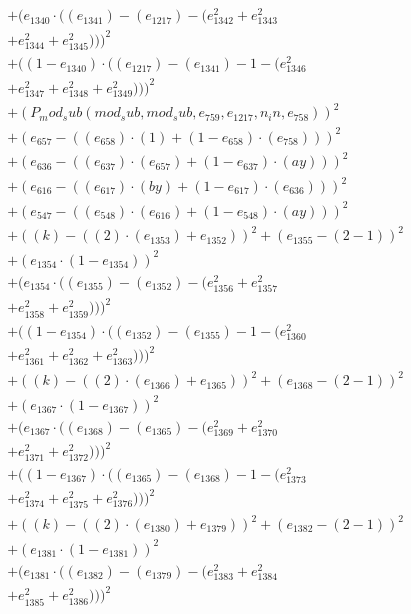 \documentclass[10pt, a4paper]{article}
\begin{document}
\begin{small}
\begin{align*}
& + (e_{1340}  \cdot  ((e_{1341}) - (e_{1217}) - (e_{1342}^{2} + e_{1343}^{2} \\
& + e_{1344}^{2} + e_{1345}^{2})))^{2} \\
& + ((1 - e_{1340})  \cdot  ((e_{1217}) - (e_{1341}) - 1 - (e_{1346}^{2} \\
& + e_{1347}^{2} + e_{1348}^{2} + e_{1349}^{2})))^{2} \\
& + (P_mod_sub(mod_sub, mod_sub, e_{759}, e_{1217}, n_in, e_{758}))^{2} \\
& + (e_{657} - ((e_{658})  \cdot  (1) + (1 - e_{658})  \cdot  (e_{758})))^{2} \\
& + (e_{636} - ((e_{637})  \cdot  (e_{657}) + (1 - e_{637})  \cdot  (ay)))^{2} \\
& + (e_{616} - ((e_{617})  \cdot  (by) + (1 - e_{617})  \cdot  (e_{636})))^{2} \\
& + (e_{547} - ((e_{548})  \cdot  (e_{616}) + (1 - e_{548})  \cdot  (ay)))^{2} \\
& + ((k) - ((2)  \cdot  (e_{1353}) + e_{1352}))^{2} + (e_{1355} - (2 - 1))^{2} \\
& + (e_{1354}  \cdot  (1 - e_{1354}))^{2} \\
& + (e_{1354}  \cdot  ((e_{1355}) - (e_{1352}) - (e_{1356}^{2} + e_{1357}^{2} \\
& + e_{1358}^{2} + e_{1359}^{2})))^{2} \\
& + ((1 - e_{1354})  \cdot  ((e_{1352}) - (e_{1355}) - 1 - (e_{1360}^{2} \\
& + e_{1361}^{2} + e_{1362}^{2} + e_{1363}^{2})))^{2} \\
& + ((k) - ((2)  \cdot  (e_{1366}) + e_{1365}))^{2} + (e_{1368} - (2 - 1))^{2} \\
& + (e_{1367}  \cdot  (1 - e_{1367}))^{2} \\
& + (e_{1367}  \cdot  ((e_{1368}) - (e_{1365}) - (e_{1369}^{2} + e_{1370}^{2} \\
& + e_{1371}^{2} + e_{1372}^{2})))^{2} \\
& + ((1 - e_{1367})  \cdot  ((e_{1365}) - (e_{1368}) - 1 - (e_{1373}^{2} \\
& + e_{1374}^{2} + e_{1375}^{2} + e_{1376}^{2})))^{2} \\
& + ((k) - ((2)  \cdot  (e_{1380}) + e_{1379}))^{2} + (e_{1382} - (2 - 1))^{2} \\
& + (e_{1381}  \cdot  (1 - e_{1381}))^{2} \\
& + (e_{1381}  \cdot  ((e_{1382}) - (e_{1379}) - (e_{1383}^{2} + e_{1384}^{2} \\
& + e_{1385}^{2} + e_{1386}^{2})))^{2} \\

\end{align*}
\end{small}
\end{document}
